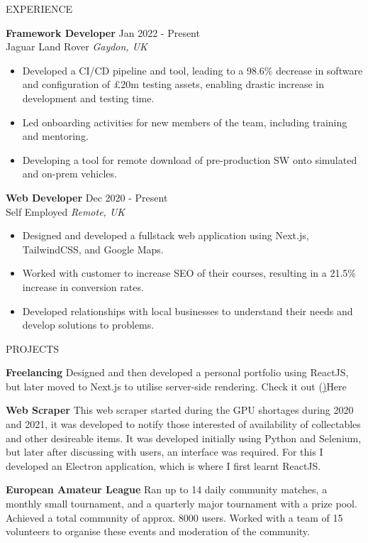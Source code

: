 \documentclass{resume} %
\begin{document}
\begin{rSection}{EXPERIENCE}

\textbf{Framework Developer} \hfill Jan 2022 - Present\\
Jaguar Land Rover \hfill \textit{Gaydon, UK}
  \begin{itemize}
    \itemsep -3pt {}
      \item Developed a CI/CD pipeline and tool, leading to a 98.6\% decrease in software and configuration of £20m testing assets, enabling drastic increase in development and testing time.
      \item Led onboarding activities for new members of the team, including training and mentoring.
      \item Developing a tool for remote download of pre-production SW onto simulated and on-prem vehicles.
  \end{itemize}

\textbf{Web Developer} \hfill Dec 2020 - Present\\
Self Employed \hfill \textit{Remote, UK}
  \begin{itemize}
    \itemsep -3pt {}
      \item Designed and developed a fullstack web application using Next.js, TailwindCSS, and Google Maps.
      \item Worked with customer to increase SEO of their courses, resulting in a 21.5\% increase in conversion rates.
      \item Developed relationships with local businesses to understand their needs and develop solutions to problems.
  \end{itemize}

\end{rSection}


\begin{rSection}{PROJECTS}
\vspace{-1.25em}
\item \textbf{Freelancing} {Designed and then developed a personal portfolio using ReactJS, but later moved to Next.js to utilise server-side rendering. Check it out (\href{https://www.sampreston.co.uk}){Here}}
\item \textbf{Web Scraper} {This web scraper started during the GPU shortages during 2020 and 2021, it was developed to notify those interested of availability of collectables and other desireable items. It was developed initially using Python and Selenium, but later after discussing with users, an interface was required. For this I developed an Electron application, which is where I first learnt ReactJS.}
\item \textbf{European Amateur League} {Ran up to 14 daily community matches, a monthly small tournament, and a quarterly major tournament with a prize pool. Achieved a total community of approx. 8000 users. Worked with a team of 15 volunteers to organise these events and moderation of the community.}
\end{rSection}
\end{document}
